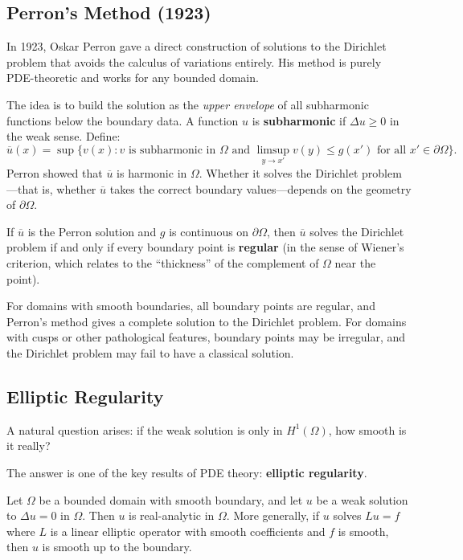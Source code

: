 \subsection{Perron's Method (1923)}

In 1923, Oskar Perron gave a direct construction of solutions to the Dirichlet problem that avoids the calculus of variations entirely. His method is purely PDE-theoretic and works for any bounded domain.

The idea is to build the solution as the \emph{upper envelope} of all subharmonic functions below the boundary data. A function $u$ is \textbf{subharmonic} if $\Delta u \geq 0$ in the weak sense. Define:
\[
    \overline{u}(x) = \sup\{v(x) : v \text{ is subharmonic in } \Omega \text{ and } \limsup_{y \to x'} v(y) \leq g(x') \text{ for all } x' \in \partial\Omega\}.
\]
Perron showed that $\overline{u}$ is harmonic in $\Omega$. Whether it solves the Dirichlet problem---that is, whether $\overline{u}$ takes the correct boundary values---depends on the geometry of $\partial\Omega$.

\begin{theorem}\label{thm:perron}
If $\overline{u}$ is the Perron solution and $g$ is continuous on $\partial\Omega$, then $\overline{u}$ solves the Dirichlet problem if and only if every boundary point is \textbf{regular} (in the sense of Wiener's criterion, which relates to the ``thickness'' of the complement of $\Omega$ near the point).
\end{theorem}

For domains with smooth boundaries, all boundary points are regular, and Perron's method gives a complete solution to the Dirichlet problem. For domains with cusps or other pathological features, boundary points may be irregular, and the Dirichlet problem may fail to have a classical solution.

\subsection{Elliptic Regularity}

A natural question arises: if the weak solution is only in $H^1(\Omega)$, how smooth is it really?

The answer is one of the key results of PDE theory: \textbf{elliptic regularity}.

\begin{theorem}\label{thm:elliptic-regularity}
Let $\Omega$ be a bounded domain with smooth boundary, and let $u$ be a weak solution to $\Delta u = 0$ in $\Omega$. Then $u$ is real-analytic in $\Omega$. More generally, if $u$ solves $Lu = f$ where $L$ is a linear elliptic operator with smooth coefficients and $f$ is smooth, then $u$ is smooth up to the boundary.
\end{theorem}

